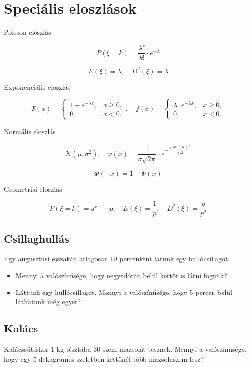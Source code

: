 \documentclass[a4paper]{article}
\begin{document}
\section{Speciális eloszlások}

Poisson eloszlás

\[
P(\xi = k) = \dfrac{\lambda^k}{k!} \cdot e^{-\lambda}
\]

\[
E(\xi) = \lambda, \quad D^2(\xi) = \lambda 
\]

Exponenciális eloszlás

\[
F(x) = \begin{cases}
1 - e^{-\lambda x}, & x \geq 0, \\
0, & x < 0.
\end{cases}, \quad
f(x) = \begin{cases}
\lambda \cdot e^{-\lambda x}, & x \geq 0, \\
0, & x < 0.
\end{cases}
\]

Normális eloszlás

\[
\mathcal{N}(\mu, \sigma^2), \quad
\varphi(x) = \dfrac{1}{\sigma \sqrt{2\pi}} \cdot e^{-\dfrac{(x - \mu)^2}{2\sigma^2}}
\]

\[
\Phi(-x) = 1 - \Phi(x)
\]

Geometriai eloszlás

\[
P(\xi = k) = q^{k - 1} \cdot p, \quad
E(\xi) = \dfrac{1}{p}, \quad
D^2(\xi) = \dfrac{q}{p^2}
\]

\subsection{Csillaghullás}

Egy augusztusi éjszakán átlagosan 10 percenként látunk egy hullócsillagot.
\begin{itemize}
\item Mennyi a valószínűsége, hogy negyedórán belül kettőt is látni fogunk?
\item Láttunk egy hullócsillagot.
Mennyi a valószínűsége, hogy 5 percen belül láthatunk még egyet?
\end{itemize}

\subsection{Kalács}

Kalácssütéskor 1 kg tésztába 30 szem mazsolát tesznek.
Mennyi a valószínűsége, hogy egy 5 dekagramos szeletben kettőnél több mazsolaszem lesz?
\end{document}

